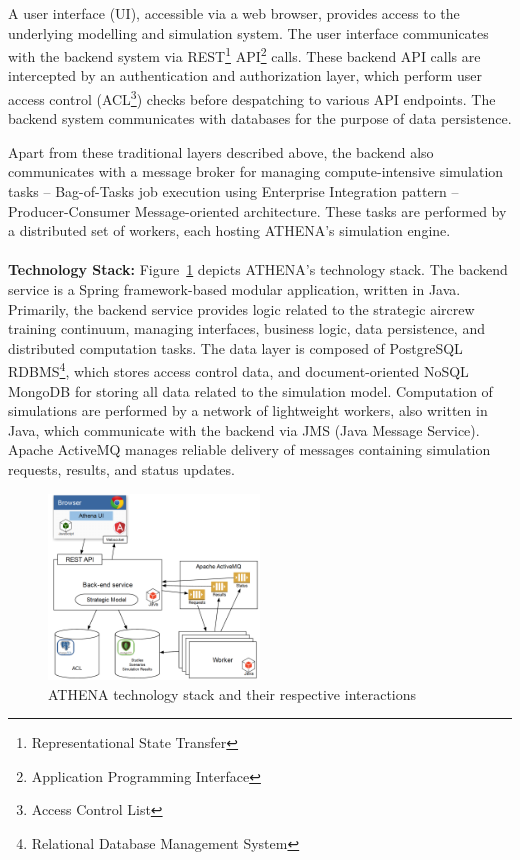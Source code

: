 A user interface (UI), accessible via a web browser, provides access to the underlying modelling and simulation system. The user interface communicates with the backend system via REST\footnote{Representational State Transfer} API\footnote{Application Programming Interface} calls. These backend API calls are intercepted by an authentication and authorization layer, which perform user access control (ACL\footnote{Access Control List}) checks before despatching to various API endpoints. The backend system communicates with databases for the purpose of data persistence.

Apart from these traditional layers described above, the backend also communicates with a message broker for managing compute-intensive simulation tasks -- Bag-of-Tasks job execution using Enterprise Integration pattern --  Producer-Consumer Message-oriented architecture. These tasks are performed by a distributed set of workers, each hosting ATHENA's simulation engine.
\\
\\
\textbf{Technology Stack:} \quad Figure~\ref{fig:techStack} depicts ATHENA's technology stack. The backend service is a Spring framework-based modular application, written in Java. Primarily, the backend service provides logic related to the strategic aircrew training continuum, managing interfaces, business logic, data persistence, and distributed computation tasks. The data layer is composed of PostgreSQL RDBMS\footnote{Relational Database Management System}, which stores access control data, and document-oriented NoSQL MongoDB for storing all data related to the simulation model. Computation of simulations are performed by a network of lightweight workers, also written in Java, which communicate with the backend via JMS (Java Message Service). Apache ActiveMQ manages reliable delivery of messages containing simulation requests, results, and status updates. 

\begin{figure}
\centering
\includegraphics[width=0.5\textwidth]{Figures/ATHENA_tech_stack}
\decoRule
\caption[ATHENA Technology Stack]{ATHENA technology stack and their respective interactions}
\label{fig:techStack}
\end{figure}

